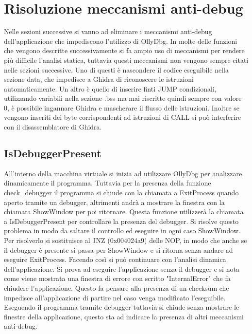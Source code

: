 \documentclass[a4paper,12pt]{article}
\begin{document}
\section{Risoluzione meccanismi anti-debug}
Nelle sezioni successive si vanno ad eliminare i meccanismi anti-debug dell'applicazione che impediscono l'utilizzo di OllyDbg. In molte delle funzioni che vengono descritte successivamente si fa ampio uso di meccanismi per rendere più difficile l'analisi statica, tuttavia questi meccanismi non vengono sempre citati nelle sezioni successive. Uno di questi è nascondere il codice eseguibile nella sezione data, che impedisce a Ghidra di riconoscere le istruzioni automaticamente. 
Un altro è quello di inserire finti JUMP condizionali, utilizzando variabili nella sezione .bss ma mai riscritte quindi sempre con valore 0, è possibile ingannare Ghidra e mascherare il flusso delle istruzioni. Inoltre se vengono inseriti dei byte corrispondenti ad istruzioni di CALL si può interferire con il disassemblatore di Ghidra.

\subsection{IsDebuggerPresent}
All'interno della macchina virtuale si inizia ad utilizzare OllyDbg per analizzare dinamicamente il programma. Tuttavia per la presenza della funzione check\_debugger il programma si chiude con la chiamata a ExitProcess quando aperto tramite un debugger, altrimenti andrà a mostrare la finestra con la chiamata ShowWindow per poi ritornare.  Questa funzione utilizzerà la chiamata a IsDebuggerPresent per controllare la presenza del debugger.
Si risolve questo problema in modo da saltare il controllo ed eseguire in ogni caso ShowWindow. Per risolverlo si sostituisce al JNZ (0x004024a9) delle NOP, in modo che anche se il debugger è presente si passa per ShowWindow e si ritorna senza andare ad eseguire ExitProcess.
 Facendo così si può continuare con l'analisi dinamica dell'applicazione. Si prova ad eseguire l'applicazione senza il debugger e si nota come viene mostrata una finestra di errore con scritto "InternalError" che fa chiudere l'applicazione. Questo fa pensare alla presenza di un checksum che impedisce all'applicazione di partire nel caso venga modificato l'eseguibile.  Eseguendo il programma tramite debugger tuttavia si chiude senza mostrare le finestre della applicazione, questo sta ad indicare la presenza di altri meccanismi anti-debug. 
\end{document}
